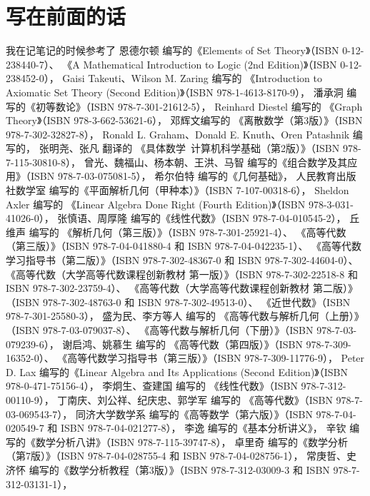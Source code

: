 \chapter*{写在前面的话}
我在记笔记的时候参考了
恩德尔顿 编写的《Elements of Set Theory》（ISBN 0-12-238440-7）、
《A Mathematical Introduction to Logic (2nd Edition)》（ISBN 0-12-238452-0），
Gaisi Takeuti、Wilson M. Zaring 编写的
《Introduction to Axiomatic Set Theory (Second Edition)》（ISBN 978-1-4613-8170-9），
潘承洞 编写的《初等数论》（ISBN 978-7-301-21612-5），
Reinhard Diestel 编写的
《Graph Theory》（ISBN 978-3-662-53621-6），
邓辉文编写的
《离散数学（第3版）》（ISBN 978-7-302-32827-8），
Ronald L. Graham、Donald E. Knuth、Oren Patashnik 编写的，
张明尧、张凡 翻译的
《具体数学\ 计算机科学基础（第2版）》（ISBN 978-7-115-30810-8），
曾光、魏福山、杨本朝、王洪、马智 编写的《组合数学及其应用》（ISBN 978-7-03-075081-5），
希尔伯特 编写的《几何基础》，
人民教育出版社数学室 编写的《平面解析几何（甲种本）》（ISBN 7-107-00318-6），
Sheldon Axler 编写的
《Linear Algebra Done Right (Fourth Edition)》（ISBN 978-3-031-41026-0），
张慎语、周厚隆 编写的《线性代数》（ISBN 978-7-04-010545-2），
丘维声 编写的
《解析几何（第三版）》（ISBN 978-7-301-25921-4）、
《高等代数（第三版）》（ISBN 978-7-04-041880-4 和 ISBN 978-7-04-042235-1）、
《高等代数学习指导书（第二版）》（ISBN 978-7-302-48367-0 和 ISBN 978-7-302-44604-0）、
《高等代数（大学高等代数课程创新教材 第一版）》（ISBN 978-7-302-22518-8 和 ISBN 978-7-302-23759-4）、
《高等代数（大学高等代数课程创新教材 第二版）》（ISBN 978-7-302-48763-0 和 ISBN 978-7-302-49513-0）、
《近世代数》（ISBN 978-7-301-25580-3），
盛为民、李方等人 编写的
《高等代数与解析几何（上册）》（ISBN 978-7-03-079037-8）、
《高等代数与解析几何（下册）》（ISBN 978-7-03-079239-6），
谢启鸿、姚慕生 编写的
《高等代数（第四版）》（ISBN 978-7-309-16352-0）、
《高等代数学习指导书（第三版）》（ISBN 978-7-309-11776-9），
Peter D. Lax 编写的《Linear Algebra and Its Applications (Second Edition)》（ISBN 978-0-471-75156-4），
李炯生、查建国 编写的
《线性代数》（ISBN 978-7-312-00110-9），
丁南庆、刘公祥、纪庆忠、郭学军 编写的
《高等代数》（ISBN 978-7-03-069543-7），
同济大学数学系 编写的《高等数学（第六版）》（ISBN 978-7-04-020549-7 和 ISBN 978-7-04-021277-8），
李逸 编写的《基本分析讲义》，
辛钦 编写的《数学分析八讲》（ISBN 978-7-115-39747-8），
卓里奇 编写的《数学分析（第7版）》（ISBN 978-7-04-028755-4 和 ISBN 978-7-04-028756-1），
常庚哲、史济怀 编写的《数学分析教程（第3版）》（ISBN 978-7-312-03009-3 和 ISBN 978-7-312-03131-1），
